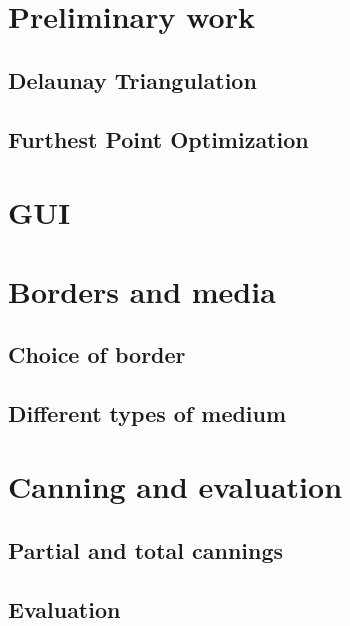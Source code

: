 \documentclass{article}
\begin{document}
\section{Preliminary work}

\subsection{Delaunay Triangulation}

\subsection{Furthest Point Optimization}


\renewcommand{\thesection}{\arabic{section}}
\setcounter{section}{0}

\section{GUI}

\section{Borders and media}

\subsection{Choice of border}

\subsection{Different types of medium}

\section{Canning and evaluation}

\subsection{Partial and total cannings}

\subsection{Evaluation}
\end{document}

